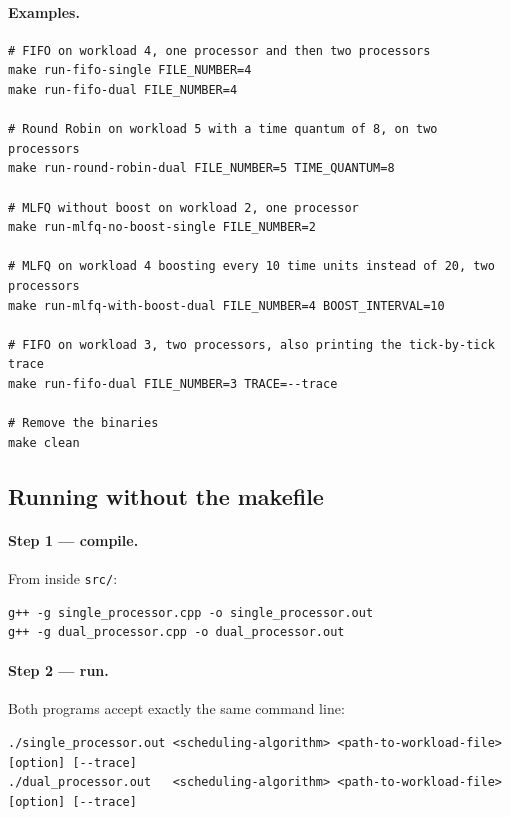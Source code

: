 \documentclass[11pt,a4paper]{article}
\begin{document}
\paragraph{Examples.}

\begin{lstlisting}
# FIFO on workload 4, one processor and then two processors
make run-fifo-single FILE_NUMBER=4
make run-fifo-dual FILE_NUMBER=4

# Round Robin on workload 5 with a time quantum of 8, on two processors
make run-round-robin-dual FILE_NUMBER=5 TIME_QUANTUM=8

# MLFQ without boost on workload 2, one processor
make run-mlfq-no-boost-single FILE_NUMBER=2

# MLFQ on workload 4 boosting every 10 time units instead of 20, two processors
make run-mlfq-with-boost-dual FILE_NUMBER=4 BOOST_INTERVAL=10

# FIFO on workload 3, two processors, also printing the tick-by-tick trace
make run-fifo-dual FILE_NUMBER=3 TRACE=--trace

# Remove the binaries
make clean
\end{lstlisting}

\subsection{Running without the makefile}

\paragraph{Step 1 --- compile.} From inside \texttt{src/}:

\begin{lstlisting}
g++ -g single_processor.cpp -o single_processor.out
g++ -g dual_processor.cpp -o dual_processor.out
\end{lstlisting}

\paragraph{Step 2 --- run.} Both programs accept exactly the same command line:

\begin{lstlisting}
./single_processor.out <scheduling-algorithm> <path-to-workload-file> [option] [--trace]
./dual_processor.out   <scheduling-algorithm> <path-to-workload-file> [option] [--trace]
\end{lstlisting}
\end{document}

